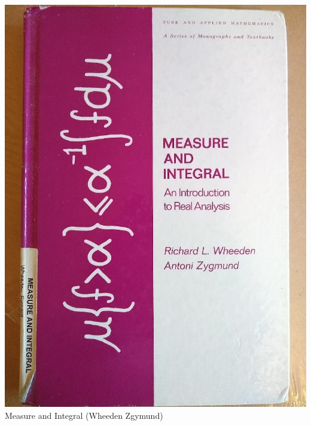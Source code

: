 \documentclass[t]{beamer}
\newcommand{\htarget}[2]{\hypertarget{#1}{#2}}
\begin{document}
\begin{frame}\htarget{MWZ}{} \begin{center}
\includegraphics[height=0.8\textheight]{Measure_and_Integral_Wheeden_Zgymund_mini.jpg} \\
Measure and Integral (Wheeden Zgymund)
\end{center} \end{frame}
\end{document}
